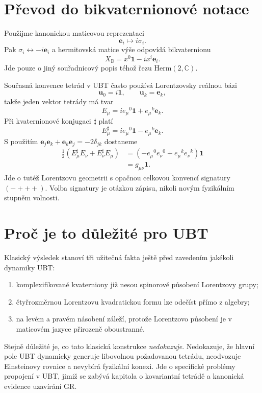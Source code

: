 \section{Převod do bikvaternionové notace}
Použijme kanonickou maticovou reprezentaci
\[
 \mathbf e_i\longmapsto i\sigma_i.
\]
Pak $\sigma_i\leftrightarrow -i\mathbf e_i$ a hermitovská matice výše
odpovídá bikvaternionu
\[
 X_{\mathbb B}=x^0\mathbf1-i x^i\mathbf e_i.
\]
Jde pouze o jiný souřadnicový popis téhož řezu
$\mathrm{Herm}(2,\mathbb C)$.

Současná konvence tetrád v UBT často používá Lorentzovsky reálnou bázi
\[
 \mathbf u_0=i\mathbf1,
 \qquad \mathbf u_k=\mathbf e_k,
\]
takže jeden vektor tetrády má tvar
\[
 E_\mu=i e_\mu{}^0\mathbf1+e_\mu{}^k\mathbf e_k.
\]
Při kvaternionové konjugaci $\sharp$ platí
\[
 E_\mu^\sharp=i e_\mu{}^0\mathbf1-e_\mu{}^k\mathbf e_k.
\]
S použitím $\mathbf e_j\mathbf e_k+\mathbf e_k\mathbf e_j=-2\delta_{jk}$
dostaneme
\begin{align*}
 \frac12(E_\mu^\sharp E_\nu+E_\nu^\sharp E_\mu)
 &=\left(-e_\mu{}^0e_\nu{}^0+e_\mu{}^k e_\nu{}^k\right)\mathbf1\\
 &=g_{\mu\nu}\mathbf1.
\end{align*}
Jde o tutéž Lorentzovu geometrii s opačnou celkovou konvencí signatury
$(-+++)$. Volba signatury je otázkou zápisu, nikoli novým fyzikálním stupněm
volnosti.

\section{Proč je to důležité pro UBT}
Klasický výsledek stanoví tři užitečná fakta ještě před zavedením jakékoli
dynamiky UBT:
\begin{enumerate}
 \item komplexifikované kvaterniony již nesou spinorové působení Lorentzovy
       grupy;
 \item čtyřrozměrnou Lorentzovu kvadratickou formu lze odečíst přímo z
       algebry;
 \item na levém a pravém násobení záleží, protože Lorentzovo působení je v
       maticovém jazyce přirozeně oboustranné.
\end{enumerate}

Stejně důležité je, co tato klasická konstrukce \emph{nedokazuje}.
Nedokazuje, že hlavní pole UBT dynamicky generuje libovolnou požadovanou
tetrádu, neodvozuje Einsteinovy rovnice a nevybírá fyzikální konexi. Jde o
specifické problémy propojení v UBT, jimiž se zabývá kapitola o kovariantní
tetrádě a kanonická evidence uzavírání GR.

